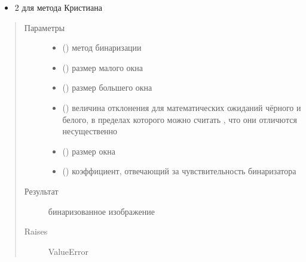 \documentclass[letterpaper,10pt,russian]{sphinxmanual}
\begin{document}
\begin{fulllineitems}
\begin{fulllineitems}
\begin{description}
\begin{itemize}
\item {} 
2 \sphinxhyphen{} для метода Кристиана

\end{itemize}

\end{description}
\begin{quote}\begin{description}
\item[{Параметры}] \leavevmode\begin{itemize}
\item {} 
 () \textendash{} метод бинаризации

\item {} 
 () \textendash{} размер малого окна

\item {} 
 () \textendash{} размер большего окна

\item {} 
 () \textendash{} величина отклонения для математических ожиданий чёрного и белого, в пределах которого можно считать         , что они отличются несущественно

\item {} 
 () \textendash{} размер окна

\item {} 
 () \textendash{} коэффициент, отвечающий за чувствительность бинаризатора

\end{itemize}

\item[{Результат}] \leavevmode
{} \textendash{} бинаризованное изображение

\item[{Raises}] \leavevmode
ValueError

\end{description}\end{quote}


\end{fulllineitems}
\end{fulllineitems}
\end{document}
